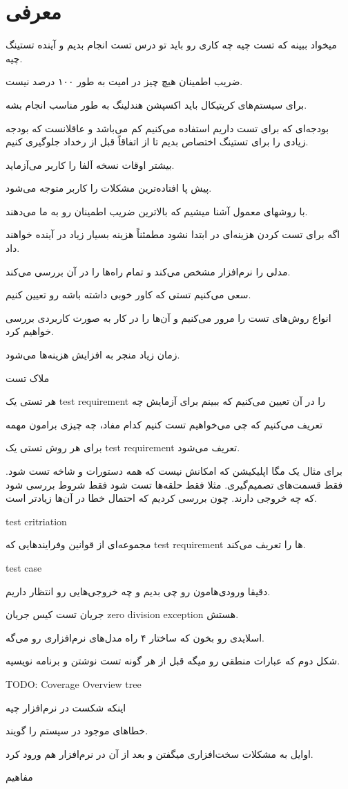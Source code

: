 \section{معرفی}

میخواد ببینه که تست چیه چه کاری رو باید تو درس تست انجام بدیم و آینده تستینگ
چیه.

ضریب اطمینان
هیچ چیز در امیت به طور ۱۰۰ درصد نیست.

برای سیستم‌های کریتیکال باید اکسپشن هندلینگ به طور مناسب انجام بشه.

بودجه‌ای که برای تست داریم استفاده می‌کنیم کم می‌باشد و عاقلانست که بودجه زیادی
را برای تستینگ اختصاص بدیم تا از اتفاقاً قبل از رخداد جلوگیری کنیم.

بیشتر اوقات نسخه آلفا را کاربر می‌آزماید.

پیش پا افتاده‌ترین مشکلات را کاربر متوجه می‌شود.

با روشهای معمول آشنا میشیم که بالاترین ضریب اطمینان رو به ما می‌دهند.

اگه برای تست کردن هزینه‌ای در ابتدا نشود مطمئناً هزینه بسیار زیاد در آینده
خواهند داد.

مدلی را نرم‌افزار مشخص می‌کند و تمام راه‌ها را در آن بررسی می‌کند.

سعی می‌کنیم تستی که کاور خوبی داشته باشه رو تعیین کنیم.

انواع روش‌های تست را مرور می‌کنیم و آن‌ها را در کار به صورت کاربردی بررسی خواهیم
کرد.

زمان زیاد منجر به افزایش هزینه‌ها می‌شود.

ملاک تست

هر تستی یک test requirement را در آن تعیین می‌کنیم که ببینم برای آزمایش چه 

تعریف می‌کنیم که چی می‌خواهیم تست کنیم کدام مفاد، چه چیزی برامون مهمه

برای هر روش تستی یک test requirement تعریف می‌شود.

برای مثال یک مگا اپلیکیشن که امکانش نیست که همه دستورات و شاخه تست شود. فقط
قسمت‌های تصمیم‌گیری. مثلا فقط حلقه‌ها تست شود فقط شروط بررسی شود که چه خروجی
دارند. چون بررسی کردیم که احتمال خطا در آن‌ها زیاد‌تر است.

test critriation

مجموعه‌ای از قوانین وفرایند‌هایی که test requirement ها را تعریف می‌کند.

test case

دقیقا ورودی‌هامون رو چی بدیم و چه خروجی‌هایی رو انتظار داریم.

جریان تست کیس جریان zero division exception هستش.

اسلایدی رو بخون که ساختار ۴ راه مدل‌های نرم‌افزاری رو می‌گه.

شکل دوم که عبارات منطقی رو میگه قبل از هر گونه تست نوشتن و برنامه نویسیه.

TODO: Coverage Overview tree

اینکه شکست در نرم‌افزار چیه


خطا‌های موجود در سیستم را گویند.



اوایل به مشکلات سخت‌افزاری میگفتن و بعد از آن در نرم‌افزار هم ورود کرد.



مفاهیم
